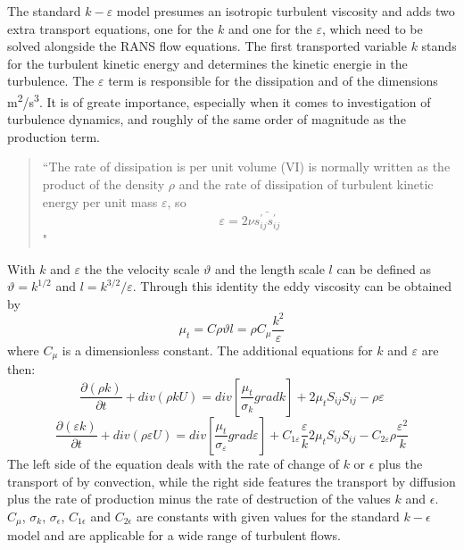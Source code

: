 The standard $k-\varepsilon$ model presumes an isotropic turbulent viscosity and adds two extra transport equations, one for the $k$ and one for the $\varepsilon$, which need to be solved alongside the RANS flow equations.
The first transported variable $k$ stands for the turbulent kinetic energy and determines the kinetic energie in the turbulence.
The $\varepsilon$ term is responsible for the dissipation and of the dimensions m\textsuperscript{2}/s\textsuperscript{3}. It is of greate importance, especially when it comes to investigation of turbulence dynamics, and roughly of the same order of magnitude as the production term.
\begin{quote}
``The rate of dissipation is per unit volume (VI) is normally written as the product of the density $\rho$ and the rate of dissipation of turbulent kinetic energy per unit mass $\varepsilon$, so
\begin{equation}
\varepsilon = 2 \nu \bar{s^{\prime}_{ij} s^{\prime}_{ij}}
\end{equation}
"
\end{quote}
With $k$ and $\varepsilon$ the the velocity scale $\vartheta$ and the length scale $l$ can be defined as $\vartheta = k^{1/2}$ and $l = k^{3/2}/\varepsilon$. Through this identity the eddy viscosity can be obtained by
\begin{equation}
\mu_t = C \rho \vartheta l = \rho C_{\mu} \frac{k^2}{\varepsilon}
\end{equation}
where $C_{\mu}$ is a dimensionless constant. The additional equations for $k$ and $\varepsilon$ are then:
\begin{equation}
\frac{\partial(\rho k)}{\partial t} + div(\rho k U) = div \left[ \frac{\mu_t}{\sigma_k} grad k \right] + 2 \mu_t S_{ij} S_{ij} - \rho \varepsilon
\end{equation}
\begin{equation}
\frac{\partial(\varepsilon k)}{\partial t} + div(\rho \varepsilon U) = div \left[ \frac{\mu_t}{\sigma_{\varepsilon}} grad \varepsilon \right] + C_{1\varepsilon} \frac{\varepsilon}{k} 2 \mu_t S_{ij} S_{ij} - C_{2\varepsilon} \rho \frac{\varepsilon^2}{k}
\end{equation}
The left side of the equation deals with the rate of change of $k$ or $\epsilon$ plus the transport of by convection, while the right side features the transport by diffusion plus the rate of production minus the rate of destruction of the values $k$ and $\epsilon$.
$C_{\mu}$, $\sigma_k$, $\sigma_{\epsilon}$, $C_{1\epsilon}$ and $C_{2\epsilon}$ are constants with given values for the standard $k-\epsilon$ model and are applicable for a wide range of turbulent flows.

